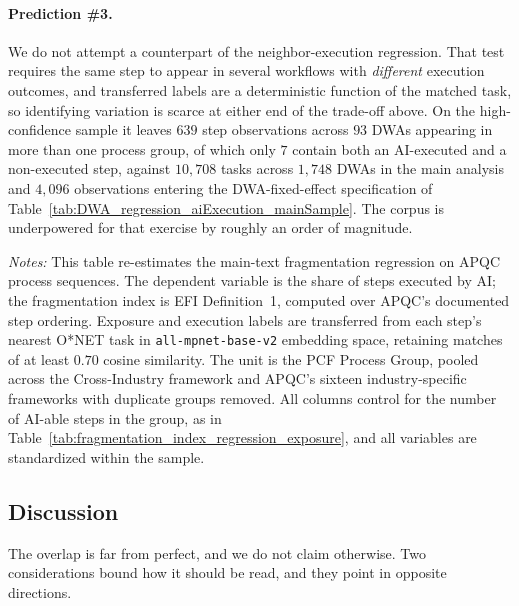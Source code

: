 \paragraph{Prediction \#3.}
We do not attempt a counterpart of the neighbor-execution regression.
That test requires the same step to appear in several workflows with \emph{different} execution outcomes, and
transferred labels are a deterministic function of the matched task, so identifying variation is scarce at
either end of the trade-off above.
On the high-confidence sample it leaves $639$ step observations across $93$ DWAs appearing in more than one
process group, of which only $7$ contain both an AI-executed and a non-executed step, against $10{,}708$ tasks
across $1{,}748$ DWAs in the main analysis and $4{,}096$ observations entering the DWA-fixed-effect
specification of Table~\ref{tab:DWA_regression_aiExecution_mainSample}.
The corpus is underpowered for that exercise by roughly an order of magnitude.

\begin{table}[h!]
    \caption{Fragmentation and AI Execution on APQC's Documented Process Sequences}
    \label{tab:apqc_fragmentation_index_regression}
    \begin{center}
    
    \end{center}
    \raggedright \footnotesize{\emph{Notes:}} This table re-estimates the main-text fragmentation regression on APQC process sequences.
    The dependent variable is the share of steps executed by AI; the fragmentation index is EFI Definition~1, computed over APQC's documented step ordering.
    Exposure and execution labels are transferred from each step's nearest O*NET task in \texttt{all-mpnet-base-v2} embedding space, retaining matches of at least $0.70$ cosine similarity.
    The unit is the PCF Process Group, pooled across the Cross-Industry framework and APQC's sixteen industry-specific frameworks with duplicate groups removed.
    All columns control for the number of AI-able steps in the group, as in Table~\ref{tab:fragmentation_index_regression_exposure}, and all variables are standardized within the sample.
\end{table}

\subsection{Discussion}
\label{app:apqc_validation_discussion}

The overlap is far from perfect, and we do not claim otherwise.
Two considerations bound how it should be read, and they point in opposite directions.

